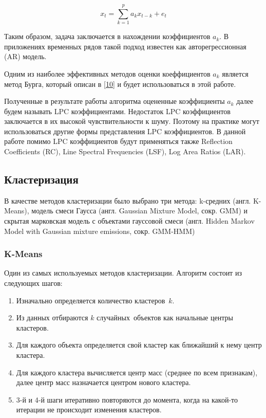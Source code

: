 \documentclass[a4paper,14pt]{extarticle}
\begin{document}
$$x_t = \sum\limits_{k=1}^{p} a_k x_{t-k} + e_t$$

Таким образом, задача заключается в нахождении коэффициентов $a_k$. В приложениях временных рядов такой подход известен как авторегрессионная (AR) модель. 

Одним из наиболее эффективных методов оценки коеффициентов $a_k$ является метод Бурга, который описан в \hyperlink{b_10}{[10]} и будет использоваться в этой работе.

Полученные в результате работы алгоритма оцененные коэффициенты $a_k$ далее будем называть LPC коэффициентами. Недостаток LPC коэффициентов заключается в их высокой чувствительности к шуму. Поэтому на практике могут использоваться другие формы представления LPC коэффициентов. В данной работе помимо LPC коэффициентов будут применяться также Reflection Coefficients (RC), Line Spectral Frequencies (LSF), Log Area Ratios (LAR).

\subsection{Кластеризация}

В качестве методов кластеризации было выбрано три метода: k-средних (англ. K-Means), модель смеси Гаусса (англ. Gaussian Mixture Model, сокр. GMM) и скрытая марковская модель с объектами гауссовой смеси (англ. Hidden Markov Model with Gaussian mixture emissions, сокр. GMM-HMM)

\subsubsection{K-Means}
Один из самых используемых методов кластеризации. Алгоритм состоит из следующих шагов:

\begin{enumerate}
	\item Изначально определяется количество кластеров $k$.
	\item Из данных отбираются $k$ случайных объектов как начальные центры кластеров.
	\item Для каждого объекта определяется свой кластер как ближайший к нему центр кластера.
	\item Для каждого кластера вычисляется центр масс (среднее по всем признакам), далее центр масс назначается центром нового кластера.
	\item 3-й и 4-й шаги итеративно повторяются до момента, когда на какой-то итерации не происходит изменения кластеров.
\end{enumerate}
\end{document}
